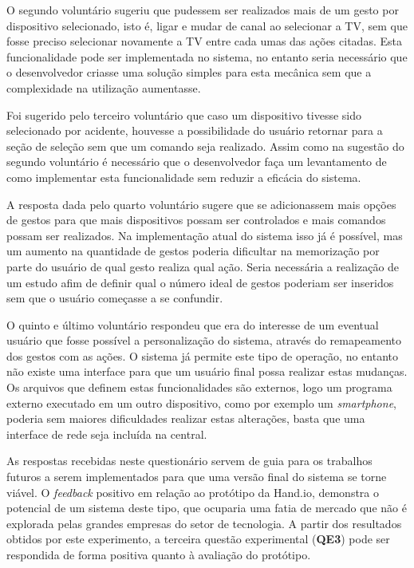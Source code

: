O segundo voluntário sugeriu que pudessem ser realizados mais de um gesto por dispositivo selecionado, isto é, ligar e mudar de canal ao selecionar a TV, sem que fosse preciso selecionar novamente a TV entre cada umas das ações citadas. Esta funcionalidade pode ser implementada no sistema, no entanto seria necessário que o desenvolvedor criasse uma solução simples para esta mecânica sem que a complexidade na utilização aumentasse.

Foi sugerido pelo terceiro voluntário que caso um dispositivo tivesse sido selecionado por acidente, houvesse a possibilidade do usuário retornar para a seção de seleção sem que um comando seja realizado. Assim como na sugestão do segundo voluntário é necessário que o desenvolvedor faça um levantamento de como implementar esta funcionalidade sem reduzir a eficácia do sistema.

A resposta dada pelo quarto voluntário sugere que se adicionassem mais opções de gestos para que mais dispositivos possam ser controlados e mais comandos possam ser realizados. Na implementação atual do sistema isso já é possível, mas um aumento na quantidade de gestos poderia dificultar na memorização por parte do usuário de qual gesto realiza qual ação. Seria necessária a realização de um estudo afim de definir qual o número ideal de gestos poderiam ser inseridos sem que o usuário começasse a se confundir.

O quinto e último voluntário respondeu que era do interesse de um eventual usuário que fosse possível a personalização do sistema, através do remapeamento dos gestos com as ações. O sistema já permite este tipo de operação, no entanto não existe uma interface para que um usuário final possa realizar estas mudanças. Os arquivos que definem estas funcionalidades são externos, logo um programa externo executado em um outro dispositivo, como por exemplo um \textit{smartphone}, poderia sem maiores dificuldades realizar estas alterações, basta que uma interface de rede seja incluída na central.

As respostas recebidas neste questionário servem de guia para os trabalhos futuros a serem implementados para que uma versão final do sistema se torne viável. O \textit{feedback} positivo em relação ao protótipo da Hand.io, demonstra o potencial de um sistema deste tipo, que ocuparia uma fatia de mercado que não é explorada pelas grandes empresas do setor de tecnologia. A partir dos resultados obtidos por este experimento, a terceira questão experimental (\textbf{QE3}) pode ser respondida de forma positiva quanto à avaliação do protótipo.